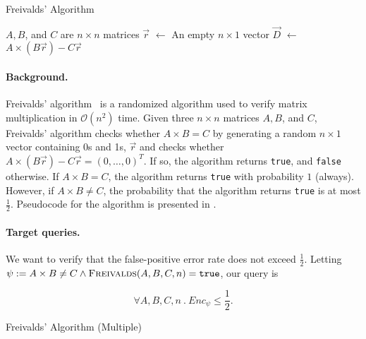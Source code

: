 \documentclass[acmsmall,review,anonymous]{acmart}\settopmatter{printfolios=true,printccs=false,printacmref=false}
\newcommand*\Let[2]{\State #1 $\gets$ #2}
\begin{document}
\begin{algorithm}[h]
  \caption{Freivalds' Algorithm}
  \label{alg:freivalds}
  \begin{algorithmic}[1]
    \Require $A,B$, and $C$ are $n \times n$ matrices
    \Let{$\vec{r}$}{An empty $n \times 1$ vector}
    \EndFor
    \Let{$\vec{D}$}{$A \times (B\vec{r}) - C\vec{r}$}
    \State{}
    \EndFunction
  \end{algorithmic}
\end{algorithm}

\paragraph*{Background.}
Freivalds' algorithm~\citep{freivalds1977} is a randomized algorithm used to verify matrix multiplication in $\mathcal{O}(n^2)$ time.
% 
Given three $n \times n$ matrices $A, B$, and $C$, Freivalds' algorithm checks whether $A \times B = C$ by generating a random $n \times 1$ vector containing 0s and 1s, $\vec{r}$ and checks whether $A \times (B\vec{r}) - C\vec{r} = (0,\ldots,0)^T$.
% 
If so, the algorithm returns \texttt{true}, and \texttt{false} otherwise.
% 
If $A \times B = C$, the algorithm returns \texttt{true} with probability $1$ (always).
% 
However, if $A \times B \neq C$, the probability that the algorithm returns \texttt{true} is at most $\frac{1}{2}$.
% 
Pseudocode for the algorithm is presented in .

\paragraph*{Target queries.}
We want to verify that the false-positive error rate does not exceed $\frac{1}{2}$.
% 
Letting $\psi := A \times B \neq C \wedge \textsc{Freivalds}(A,B,C,n) = \texttt{true}$, our query is

\begin{equation}
	\forall A,B,C,n~.~Enc_\psi \leq \frac{1}{2}.\label{eq:freivalds}
\end{equation}

\begin{algorithm}[h]
  \caption{Freivalds' Algorithm (Multiple)}
  \label{alg:mult_freivalds}
  \begin{algorithmic}[1]
    \State{}
    \EndIf
    \EndFor
    \State{}
    \EndFunction
  \end{algorithmic}
\end{algorithm}
\end{document}
